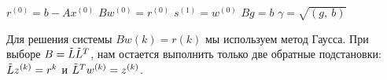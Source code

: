 \begin{algorithm*}[H]
  
  \DontPrintSemicolon

  $r^{(0)} = b - A x^{(0)}$\;
  $B w^{(0)} = r^{(0)}$\;
  $s^{(1)} = w^{(0)}$\;
  $B g = b$\;
  $\gamma = \sqrt{\left( g,\ b \right)}$\;

\end{algorithm*}

Для решения системы $Bw(k) = r(k)$ мы используем метод Гаусса.
При выборе $B = \Tilde{L} \Tilde{L}^T $, нам остается выполнить только две обратные подстановки:
$ \Tilde{L} z^{(k)} = r^{k} $ и $ \Tilde{L}^T w^{(k)} = z^{(k)}$.